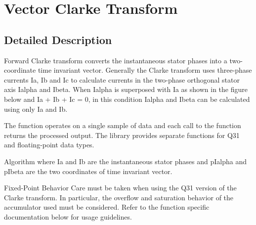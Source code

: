 \hypertarget{group__clarke}{}\section{Vector Clarke Transform}
\label{group__clarke}


\subsection{Detailed Description}
Forward Clarke transform converts the instantaneous stator phases into a two-\/coordinate time invariant vector. Generally the Clarke transform uses three-\/phase currents {\ttfamily Ia, Ib and Ic} to calculate currents in the two-\/phase orthogonal stator axis {\ttfamily Ialpha} and {\ttfamily Ibeta}. When {\ttfamily Ialpha} is superposed with {\ttfamily Ia} as shown in the figure below  and {\ttfamily Ia + Ib + Ic = 0}, in this condition {\ttfamily Ialpha} and {\ttfamily Ibeta} can be calculated using only {\ttfamily Ia} and {\ttfamily Ib}.

The function operates on a single sample of data and each call to the function returns the processed output. The library provides separate functions for Q31 and floating-\/point data types. \begin{DoxyParagraph}{Algorithm}
 where {\ttfamily Ia} and {\ttfamily Ib} are the instantaneous stator phases and {\ttfamily p\+Ialpha} and {\ttfamily p\+Ibeta} are the two coordinates of time invariant vector. 
\end{DoxyParagraph}
\begin{DoxyParagraph}{Fixed-\/\+Point Behavior}
Care must be taken when using the Q31 version of the Clarke transform. In particular, the overflow and saturation behavior of the accumulator used must be considered. Refer to the function specific documentation below for usage guidelines. 
\end{DoxyParagraph}
